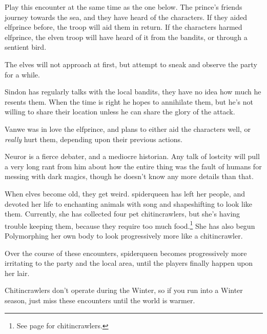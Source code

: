 \begin{multicols}{2}
Play this encounter at the same time as the one below.  The prince's friends journey towards the sea, and they have heard of the characters.  If they aided \gls{elfprince} before, the troop will aid them in return.  If the characters harmed \gls{elfprince}, the elven troop will have heard of it from the bandits, or through a sentient bird.

The elves will not approach at first, but attempt to sneak and observe the party for a while.


Sindon has regularly talks with the local bandits, they have no idea how much he resents them.
When the time is right he hopes to annihilate them, but he's not willing to share their location unless he can share the glory of the attack.


Vanwe was in love the \gls{elfprince}, and plans to either aid the characters well, or \emph{really} hurt them, depending upon their previous actions.

Neuror is a fierce debater, and a mediocre historian.  Any talk of \gls{lostcity} will pull a very long rant from him about how the entire thing was the fault of humans for messing with dark magics, though he doesn't know any more details than that.

\label{neuror}

\startcontents[Villages]
\stopcontents[Villages]

\sqminitoc

When elves become old, they get weird.  \Gls{spiderqueen} has left her people, and devoted her life to enchanting animals with song and shapeshifting to look like them.  Currently, she has collected four pet chitincrawlers, but she's having trouble keeping them, because they require too much food.\footnote{See page \pageref{chitincrawler} for chitincrawlers.}
She has also begun Polymorphing her own body to look progressively more like a chitincrawler.

Over the course of these encounters, \gls{spiderqueen} becomes progressively more irritating to the party and the local area, until the players finally happen upon her lair.

Chitincrawlers don't operate during the Winter, so if you run into a Winter season, just miss these encounters until the world is warmer.


\end{multicols}
